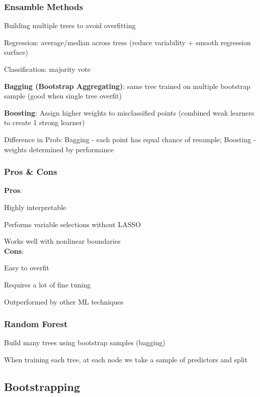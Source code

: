 \documentclass[8pt]{extarticle}
\begin{document}
\subsubsection*{Ensamble Methods}
Building multiple trees to avoid overfitting \par
Regression: average/median across tress (reduce variability + smooth regression surface)\par
Classification: majority vote \par
\textbf{Bagging (Bootstrap Aggregating)}: same tree trained on multiple bootstrap sample (good when single tree overfit)\par
\textbf{Boosting}: Assign higher weights to misclassified points (combined weak learners to create 1 strong learner)\par
Difference in Prob: Bagging - each point has equal chance of resample; Boosting - weights determined by performance \\

\subsubsection*{Pros \& Cons}
\begin{multicols}{2}
\textbf{Pros}: \par
Highly interpretable \par
Performs variable selections without LASSO \par
Works well with nonlinear boundaries\\

\textbf{Cons}:\par
Easy to overfit \par
Requires a lot of fine tuning \par
Outperformed by other ML techniques \\
\end{multicols}

\subsubsection*{Random Forest}
Build many trees using bootstrap samples (bagging)\par
When training each tree, at each node we take a sample of predictors and split\\
\hline

\subsection*{Bootstrapping}
\end{document}
